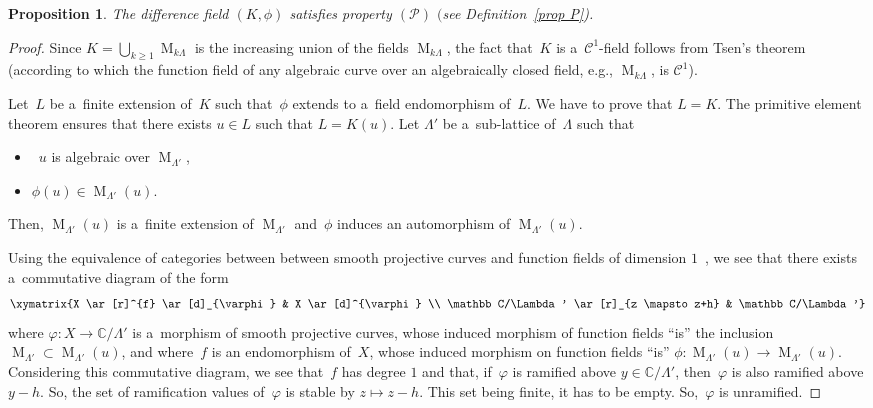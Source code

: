 \documentclass[pdftex]{sigma}
\numberwithin{equation}{section}
\newtheorem{Proposition}[Theorem]{Proposition}
{ \theoremstyle{definition}
\newtheorem{Definition}[Theorem]{Definition}
\newtheorem{Remark}[Theorem]{Remark} }
\begin{document}
\begin{Proposition}
The difference field $(K,\phi)$ satisfies property $(\mathcal{P})$ $($see Definition~{\rm \ref{prop P})}.
\end{Proposition}

\begin{proof}
Since $K = \bigcup_{k \geq 1} \operatorname{M}_{k \Lambda}$ is the increasing union of the f\/ields
$\operatorname{M}_{k \Lambda}$, the fact that~$K$ is a~$\mathcal{C}^{1}$-f\/ield follows from Tsen's
theorem~\cite{LangQAC} (according to which the function f\/ield of any algebraic curve over an algebraically closed f\/ield,
e.g.,
$\operatorname{M}_{k \Lambda}$, is $\mathcal{C}^{1}$).

Let~$L$ be a~f\/inite extension of~$K$ such that~$\phi$ extends to a~f\/ield endomorphism of~$L$.
We have to prove that $L=K$.
The primitive element theorem ensures that there exists $u \in L$ such that $L=K(u)$.
Let $\Lambda'$ be a~sub-lattice of~$\Lambda$ such that
\begin{itemize}
\itemsep=0pt
\item~$u$ is algebraic over $\operatorname{M}_{\Lambda'}$,
\item $\phi(u) \in \operatorname{M}_{\Lambda'}(u)$.
\end{itemize}
Then, $\operatorname{M}_{\Lambda'}(u)$ is a~f\/inite extension of $\operatorname{M}_{\Lambda'}$ and~$\phi$ induces an
automorphism of $\operatorname{M}_{\Lambda'}(u)$.

Using the equivalence of categories between between smooth projective curves and function f\/ields of dimension
$1$~\cite[Corollary 6.12]{HartshorneAG}, we see that there exists a~commutative diagram of the form
\begin{gather*}
\xymatrix{X \ar[r]^{f} \ar[d]_{\varphi} &  X \ar[d]^{\varphi}
\\
\mathbb C/\Lambda' \ar[r]_{z \mapsto z+h}  & \mathbb C/\Lambda'}
\end{gather*}
where $\varphi: X \rightarrow \mathbb C/\Lambda'$ is a~morphism of smooth projective curves, whose induced morphism of
function f\/ields ``is'' the inclusion $\operatorname{M}_{\Lambda'} \subset \operatorname{M}_{\Lambda'}(u)$, and where~$f$
is an endomorphism of~$X$, whose induced morphism on function f\/ields ``is'' $\phi: \operatorname{M}_{\Lambda'}(u)
\rightarrow \operatorname{M}_{\Lambda'}(u)$.
Considering this commutative diagram, we see that~$f$ has degree $1$ and that, if~$\varphi$ is ramif\/ied above $y \in
\mathbb C/\Lambda'$, then~$\varphi$ is also ramif\/ied above $y-h$.
So, the set of ramif\/ication values of~$\varphi$ is stable by $z \mapsto z-h$.
This set being f\/inite, it has to be empty.
So,~$\varphi$ is unramif\/ied.


\end{proof}
\end{document}
